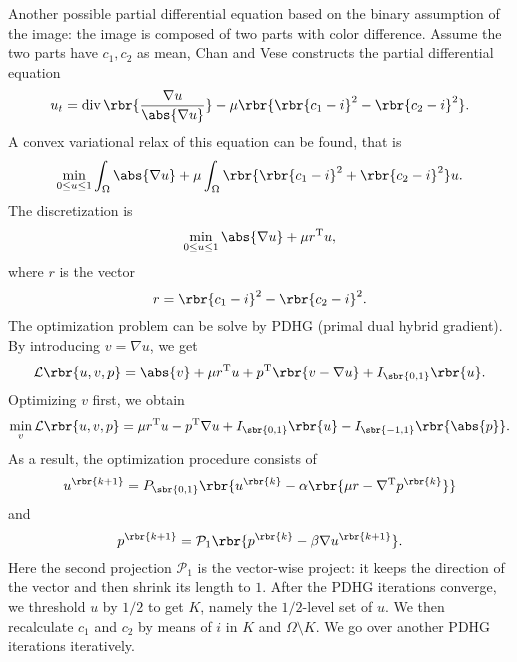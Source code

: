 \documentclass[english, nochinese]{pnote}
\DeclareMathOperator\opdiv{\mathrm{div}}
\begin{document}
Another possible partial differential equation based on the binary assumption of the image: the image is composed of two parts with color difference. Assume the two parts have $ c_1, c_2 $ as mean, Chan and Vese \parencite{goldstein_geometric_2010} constructs the partial differential equation
\begin{equation}
u_t = \opdiv \rbr{\frac{ \nabla u }{\abs{ \nabla u }}} - \mu \rbr{ \rbr{ c_1 - i }^2 - \rbr{ c_2 - i }^2 }.
\end{equation}
A convex variational relax of this equation can be found, that is
\begin{equation}
\min_{ 0 \le u \le 1 } \int_{\Omega} \abs{ \nabla u } + \mu \int_{\Omega} \rbr{ \rbr{ c_1 - i }^2 + \rbr{ c_2 - i }^2 } u.
\end{equation}
The discretization is
\begin{equation}
\min_{ 0 \le u \le 1 } \abs{ \nabla u } + \mu r^{\text{T}} u,
\end{equation}
where $r$ is the vector
\begin{equation}
r = \rbr{ c_1 - i }^2 - \rbr{ c_2 - i }^2.
\end{equation}
The optimization problem can be solve by PDHG (primal dual hybrid gradient). By introducing $ v = \nabla u $, we get
\begin{equation}
\mathcal{L} \rbr{ u, v, p } = \abs{v} + \mu r^{\text{T}} u + p^{\text{T}} \rbr{ v - \nabla u } + I_{\sbr{ 0, 1 }} \rbr{u}.
\end{equation}
Optimizing $v$ first, we obtain
\begin{equation}
\min_v \mathcal{L} \rbr{ u, v, p } = \mu r^{\text{T}} u - p^{\text{T}} \nabla u + I_{\sbr{ 0, 1 }} \rbr{u} - I_{\sbr{ -1, 1 }} \rbr{\abs{p}}.
\end{equation}
As a result, the optimization procedure consists of
\begin{equation}
u^{\rbr{ k + 1 }} = P_{\sbr{ 0, 1 }} \rbr{ u^{\rbr{k}} - \alpha \rbr{ \mu r - \nabla^{\text{T}} p^{\rbr{k}} } }
\end{equation}
and
\begin{equation}
p^{\rbr{ k + 1 }} = \mathcal{P}_1 \rbr{ p^{\rbr{k}} - \beta \nabla u^{\rbr{ k + 1 }} }.
\end{equation}
Here the second projection $ \mathcal{P}_1 $ is the vector-wise project: it keeps the direction of the vector and then shrink its length to $1$. After the PDHG iterations converge, we threshold $u$ by $ 1 / 2 $ to get $K$, namely the $ 1 / 2 $-level set of $u$. We then recalculate $c_1$ and $c_2$ by means of $i$ in $K$ and $ \Omega \setminus K $. We go over another PDHG iterations iteratively.
\end{document}
